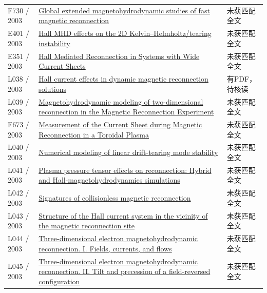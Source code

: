 \begin{longtable}{P{24mm}P{97mm}P{27mm}}
F730 / 2003 & \href{https://doi.org/10.1063/1.1566026}{Global extended magnetohydrodynamic studies of fast magnetic reconnection} & 未获匹配全文\\

E401 / 2003 & \href{https://doi.org/10.1016/s0375-9601(02)01807-8}{Hall MHD effects on the 2D Kelvin–Helmholtz/tearing instability} & 未获匹配全文\\

E351 / 2003 & \href{http://ui.adsabs.harvard.edu/abs/2003APS..DPPGP1117S/abstract}{Hall Mediated Reconnection in Systems with Wide Current Sheets} & 未获匹配全文\\

L038 / 2003 & \href{https://doi.org/10.1063/1.1590980}{Hall current effects in dynamic magnetic reconnection solutions} & 有PDF，待核读\\

L039 / 2003 & \href{https://doi.org/10.1063/1.1591182}{Magnetohydrodynamic modeling of two-dimensional reconnection in the Magnetic Reconnection Experiment} & 未获匹配全文\\

F673 / 2003 & \href{https://doi.org/10.1103/physrevlett.90.035003}{Measurement of the Current Sheet during Magnetic Reconnection in a Toroidal Plasma} & 未获匹配全文\\

L040 / 2003 & \href{https://doi.org/10.1063/1.1554739}{Numerical modeling of linear drift-tearing mode stability} & 未获匹配全文\\

L041 / 2003 & \href{https://doi.org/10.1063/1.1559971}{Plasma pressure tensor effects on reconnection: Hybrid and Hall-magnetohydrodynamics simulations} & 未获匹配全文\\

L042 / 2003 & \href{https://doi.org/10.1029/2002ja009699}{Signatures of collisionless magnetic reconnection} & 未获匹配全文\\

L043 / 2003 & \href{https://doi.org/10.1029/2003ja009900}{Structure of the Hall current system in the vicinity of the magnetic reconnection site} & 未获匹配全文\\

L044 / 2003 & \href{https://doi.org/10.1063/1.1578998}{Three-dimensional electron magnetohydrodynamic reconnection. I. Fields,  currents,  and flows} & 未获匹配全文\\

L045 / 2003 & \href{https://doi.org/10.1063/1.1578999}{Three-dimensional electron magnetohydrodynamic reconnection. II. Tilt and precession of a field-reversed configuration} & 未获匹配全文\\


\end{longtable}
